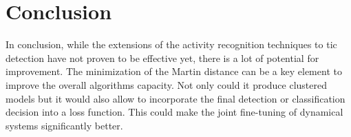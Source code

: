 \documentclass[twocolumn,10pt]{asme2ej}
\begin{document}
\section{Conclusion}
In conclusion, while the extensions of the activity recognition techniques to tic detection have not proven to be effective yet, there is a lot of potential for improvement. The minimization of the Martin distance can be a key element to improve the overall algorithms capacity. Not only could it produce clustered models but it would also allow to incorporate the final detection or classification decision into a loss function. This could make the joint fine-tuning of dynamical systems significantly better.


\end{document}

